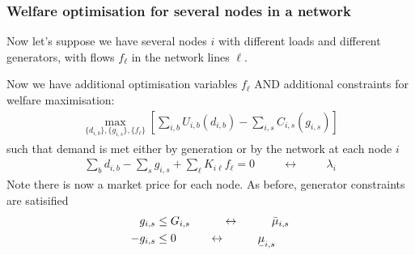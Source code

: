 \documentclass[10pt,aspectratio=169,dvipsnames]{beamer}
\def\l{\lambda}
\def\m{\mu}
\newcommand{\ubar}[1]{\text{\b{$#1$}}}
\begin{document}
\begin{frame}[fragile]
  \frametitle{Welfare optimisation for several nodes in a network}

  Now let's suppose we have several nodes $i$ with different loads and
  different generators, with flows $f_\ell$ in the network lines $\ell$.

  Now we have additional optimisation variables $f_\ell$ AND
  additional constraints for welfare maximisation:
  \begin{align*}
    \max_{\{d_{i,b}\},\{g_{i,s}\},\{f_\ell\}}\left[\sum_{i,b} U_{i,b}(d_{i,b}) - \sum_{i,s} C_{i,s} (g_{i,s}) \right]
  \end{align*}
  such that demand is met either by generation or by the network at each node $i$
  \begin{align*}
    \sum_{b} d_{i,b} - \sum_{s} g_{i,s} +  \sum_\ell K_{i\ell}f_\ell  = 0 \hspace{1cm}\leftrightarrow\hspace{1cm} \l_i
  \end{align*}
  Note there is now a \alert{market price for each node}. As before, generator constraints are satisified
    \begin{align*}
        g_{i,s}  & \leq  G_{i,s}  \hspace{1cm}\leftrightarrow\hspace{1cm} \bar{\m}_{i,s} \\
    - g_{i,s}  & \leq  0  \hspace{1cm}\leftrightarrow\hspace{1cm} \ubar{\m}_{i,s}
  \end{align*}



\end{frame}
\end{document}
